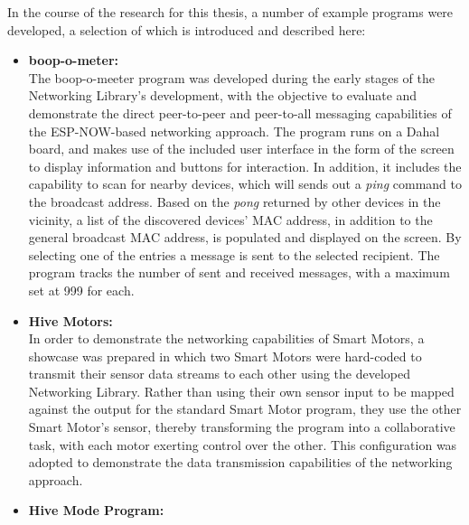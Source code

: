 In the course of the research for this thesis, a number of example programs were developed, a selection of which is introduced and described here: 
\begin{itemize}
    \item \textbf{boop-o-meter:}\\
    The boop-o-meeter program was developed during the early stages of the Networking Library's development, with the objective to evaluate and demonstrate the direct peer-to-peer and peer-to-all messaging capabilities of the ESP-NOW-based networking approach. The program runs on a Dahal board, and makes use of the included user interface in the form of the screen to display information and buttons for interaction. In addition, it includes the capability to scan for nearby devices, which will sends out a \textit{ping} command to the broadcast address. Based on the \textit{pong} returned by other devices in the vicinity, a list of the discovered devices' MAC address, in addition to the general broadcast MAC address, is populated and displayed on the screen. By selecting one of the entries a message is sent to the selected recipient. The program tracks the number of sent and received messages, with a maximum set at 999 for each.
    \item \textbf{Hive Motors:}\\
    In order to demonstrate the networking capabilities of Smart Motors, a showcase was prepared in which two Smart Motors were hard-coded to transmit their sensor data streams to each other using the developed Networking Library. Rather than using their own sensor input to be mapped against the output for the standard Smart Motor program, they use the other Smart Motor's sensor, thereby transforming the program into a collaborative task, with each motor exerting control over the other. This configuration was adopted to demonstrate the data transmission capabilities of the networking approach.
    \item \textbf{Hive Mode Program:}\\

\end{itemize}
